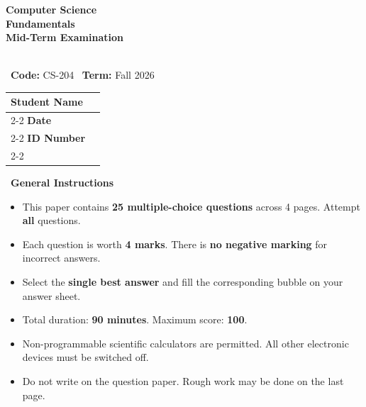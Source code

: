 \documentclass[11pt,a4paper]{article}
\begin{document}
\begin{tcolorbox}[
  colback=NavyBlue!7,
  colframe=NavyBlue,
  boxrule=1.5pt,
  sharp corners,
  left=18pt,
  right=18pt,
  top=14pt,
  bottom=14pt,
]
\begin{minipage}[t]{0.56\textwidth}
  \raggedright
  {\huge\bfseries\color{NavyBlue}Computer Science}\\[3pt]
  {\LARGE\bfseries\color{NavyBlue}Fundamentals}\\[8pt]
  {\large\color{DarkText}\textbf{Mid-Term Examination}}\\[5pt]
  \\[2pt]
  {\small\color{NavyBlue!70}\faFile\ \textbf{Code:} CS-204 \hspace{16pt} \faCalendar\ \textbf{Term:} Fall 2026}
\end{minipage}
\hfill
\begin{minipage}[t]{0.40\textwidth}
  \raggedleft
  \begin{scorebox}[AccentGold]
    \scriptsize
    \renewcommand{\arraystretch}{1.5}
    \begin{tabular}{@{}p{1.6cm} p{2.3cm}@{}}
      \textbf{Student Name} & \\ \cline{2-2}
      \textbf{Date}          & \\ \cline{2-2}
      \textbf{ID Number}     & \\ \cline{2-2}
    \end{tabular}
  \end{scorebox}
\end{minipage}
\end{tcolorbox}

\vspace{10pt}

\begin{infobox}
{\color{NavyBlue}\faInfoCircle\ \textbf{General Instructions}}
\vspace{2pt}
\begin{itemize}[nosep,leftmargin=14pt,itemsep=0.5pt,topsep=2pt]
  \item This paper contains \textbf{25 multiple-choice questions} across 4 pages. Attempt \textbf{all} questions.
  \item Each question is worth \textbf{4 marks}. There is \textbf{no negative marking} for incorrect answers.
  \item Select the \textbf{single best answer} and fill the corresponding bubble on your answer sheet.
  \item Total duration: \textbf{90 minutes}. Maximum score: \textbf{100}.
  \item Non-programmable scientific calculators are permitted. All other electronic devices must be switched off.
  \item Do not write on the question paper. Rough work may be done on the last page.
\end{itemize}
\end{infobox}
\end{document}
